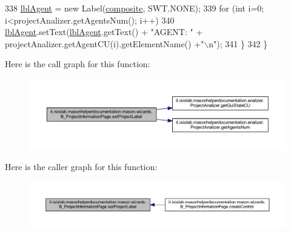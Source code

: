 \begin{DoxyCode}
338             \hyperlink{classit_1_1isislab_1_1masonhelperdocumentation_1_1mason_1_1wizards_1_1_b___project_information_page_a13700876bf889b097f466ac7d3e7128c}{lblAgent} = \textcolor{keyword}{new} Label(\hyperlink{classit_1_1isislab_1_1masonhelperdocumentation_1_1mason_1_1wizards_1_1_b___project_information_page_a5463a1c435b5fdb6fc4ca2009d7ed215}{composite}, SWT.NONE);
339             \textcolor{keywordflow}{for} (\textcolor{keywordtype}{int} i=0; i<projectAnalizer.getAgentsNum(); i++)
340                 \hyperlink{classit_1_1isislab_1_1masonhelperdocumentation_1_1mason_1_1wizards_1_1_b___project_information_page_a13700876bf889b097f466ac7d3e7128c}{lblAgent}.setText(\hyperlink{classit_1_1isislab_1_1masonhelperdocumentation_1_1mason_1_1wizards_1_1_b___project_information_page_a13700876bf889b097f466ac7d3e7128c}{lblAgent}.getText() + \textcolor{stringliteral}{"AGENT: "} + 
      projectAnalizer.getAgentCU(i).getElementName() +\textcolor{stringliteral}{"\(\backslash\)n"});
341         \}
342     \}
\end{DoxyCode}


Here is the call graph for this function\-:
\nopagebreak
\begin{figure}[H]
\begin{center}
\leavevmode
\includegraphics[width=350pt]{classit_1_1isislab_1_1masonhelperdocumentation_1_1mason_1_1wizards_1_1_b___project_information_page_afa7497cd5a5b4b3c5fb7f7f1397ebb72_cgraph}
\end{center}
\end{figure}




Here is the caller graph for this function\-:
\nopagebreak
\begin{figure}[H]
\begin{center}
\leavevmode
\includegraphics[width=350pt]{classit_1_1isislab_1_1masonhelperdocumentation_1_1mason_1_1wizards_1_1_b___project_information_page_afa7497cd5a5b4b3c5fb7f7f1397ebb72_icgraph}
\end{center}
\end{figure}




